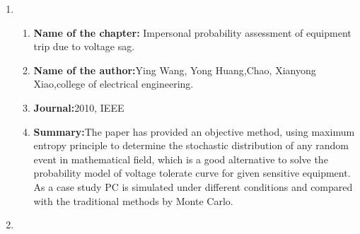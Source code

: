 \documentclass[12pt, a4paper]{extreport}
\begin{document}
\begin{enumerate}
\item 
    \begin{enumerate}
        \item{\textbf{Name of the chapter:}} Impersonal probability assessment of equipment trip due to voltage sag. 

       \item{\textbf{Name of the author:}}Ying Wang, Yong Huang,Chao, Xianyong Xiao,college of electrical engineering. \linebreak
        
         \item{\textbf{Journal:}}2010, IEEE
        \item{\textbf{Summary:}}The paper has provided
an objective method,
using maximum entropy
principle to determine the
stochastic distribution of
any random event in
mathematical field, which
is a good alternative to
solve the probability
model of voltage tolerate
curve for given sensitive
equipment. As a case
study PC is simulated
under different conditions
and compared with the
traditional methods by
Monte Carlo.
\end{enumerate}
        
        \item 
        
        \begin{enumerate}
            

\end{enumerate}
\end{enumerate}
\end{document}
